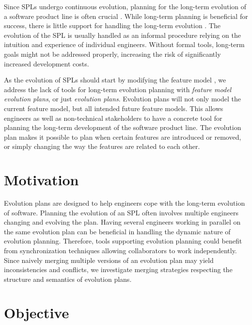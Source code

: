 \documentclass[a4paper,english]{ifimaster}
\begin{document}
Since SPLs undergo continuous evolution, planning for the long-term evolution of a software product line is often crucial \cite{cite:product_line_evolution_reasoning}. While long-term planning is beneficial for success, there is little support for handling the long-term evolution \cite{cite:evofm_fm_planning}. The evolution of the SPL is usually handled as an informal procedure relying on the intuition and experience of individual engineers. Without formal tools, long-term goals might not be addressed properly, increasing the risk of significantly increased development costs.

As the evolution of SPLs should start by modifying the feature model \cite{cite:alves_product_line_refactoring}, we address the lack of tools for long-term evolution planning with \textit{feature model evolution plans}, or just \textit{evolution plans}. Evolution plans will not only model the current feature model, but all intended future feature models. This allows engineers as well as non-technical stakeholders to have a concrete tool for planning the long-term development of the software product line. The evolution plan makes it possible to plan when certain features are introduced or removed, or simply changing the way the features are related to each other. 

\section{Motivation}%
\label{sec:motivation}

Evolution plans are designed to help engineers cope with the long-term evolution of software. Planning the evolution of an SPL often involves multiple engineers changing and evolving the plan. Having several engineers working in parallel on the same evolution plan can be beneficial in handling the dynamic nature of evolution planning.  Therefore, tools supporting evolution planning could benefit from synchronization techniques allowing collaborators to work independently. Since naively merging multiple versions of an evolution plan may yield inconsistencies and conflicts, we investigate merging strategies respecting the structure and semantics of evolution plans.

\section{Objective}%
\label{sec:objective}
\end{document}
